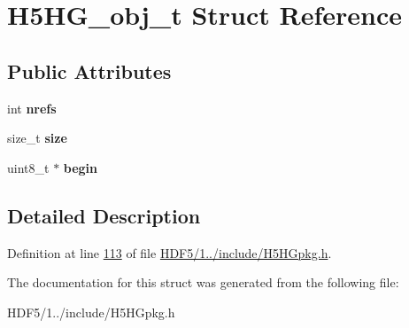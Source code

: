 \hypertarget{struct_h5_h_g__obj__t}{}\section{H5\+H\+G\+\_\+obj\+\_\+t Struct Reference}
\label{struct_h5_h_g__obj__t}
\subsection*{Public Attributes}
\begin{DoxyCompactItemize}
\item 
\mbox{\label{struct_h5_h_g__obj__t_a20f4c927b4ce248ac15c0a841fb9087e}} 
int {\bfseries nrefs}
\item 
\mbox{\label{struct_h5_h_g__obj__t_a03d208700d316b8f47514adee581dea3}} 
size\+\_\+t {\bfseries size}
\item 
\mbox{\label{struct_h5_h_g__obj__t_a2bfb8262a33eff91f50d581644fa3541}} 
uint8\+\_\+t $\ast$ {\bfseries begin}
\end{DoxyCompactItemize}


\subsection{Detailed Description}


Definition at line \hyperlink{_h_d_f5_21_810_81_2include_2_h5_h_gpkg_8h_source_l00113}{113} of file \hyperlink{_h_d_f5_21_810_81_2include_2_h5_h_gpkg_8h_source}{H\+D\+F5/1../include/\+H5\+H\+Gpkg.\+h}.



The documentation for this struct was generated from the following file\+:\begin{DoxyCompactItemize}
\item 
H\+D\+F5/1../include/\+H5\+H\+Gpkg.\+h\end{DoxyCompactItemize}

